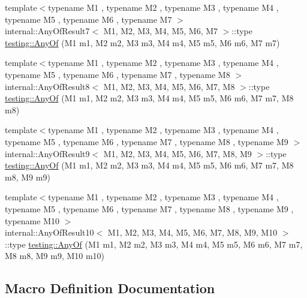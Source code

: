 \begin{DoxyCompactItemize}
\item 
{\footnotesize template$<$typename M1 , typename M2 , typename M3 , typename M4 , typename M5 , typename M6 , typename M7 $>$ }\\internal\+::\+Any\+Of\+Result7$<$ M1, M2, M3, M4, M5, M6, M7 $>$\+::type \hyperlink{namespacetesting_a754d1bddb237e79613f6834af3329efa}{testing\+::\+Any\+Of} (M1 m1, M2 m2, M3 m3, M4 m4, M5 m5, M6 m6, M7 m7)
\item 
{\footnotesize template$<$typename M1 , typename M2 , typename M3 , typename M4 , typename M5 , typename M6 , typename M7 , typename M8 $>$ }\\internal\+::\+Any\+Of\+Result8$<$ M1, M2, M3, M4, M5, M6, M7, M8 $>$\+::type \hyperlink{namespacetesting_a9c979c62cc004664b14e0ce444e531d5}{testing\+::\+Any\+Of} (M1 m1, M2 m2, M3 m3, M4 m4, M5 m5, M6 m6, M7 m7, M8 m8)
\item 
{\footnotesize template$<$typename M1 , typename M2 , typename M3 , typename M4 , typename M5 , typename M6 , typename M7 , typename M8 , typename M9 $>$ }\\internal\+::\+Any\+Of\+Result9$<$ M1, M2, M3, M4, M5, M6, M7, M8, M9 $>$\+::type \hyperlink{namespacetesting_a873c812db953aebd4bf2ffbff0e8d770}{testing\+::\+Any\+Of} (M1 m1, M2 m2, M3 m3, M4 m4, M5 m5, M6 m6, M7 m7, M8 m8, M9 m9)
\item 
{\footnotesize template$<$typename M1 , typename M2 , typename M3 , typename M4 , typename M5 , typename M6 , typename M7 , typename M8 , typename M9 , typename M10 $>$ }\\internal\+::\+Any\+Of\+Result10$<$ M1, M2, M3, M4, M5, M6, M7, M8, M9, M10 $>$\+::type \hyperlink{namespacetesting_a1797921d3ed04c7f13dfa8f36bf0bf1c}{testing\+::\+Any\+Of} (M1 m1, M2 m2, M3 m3, M4 m4, M5 m5, M6 m6, M7 m7, M8 m8, M9 m9, M10 m10)
\end{DoxyCompactItemize}


\subsection{Macro Definition Documentation}
